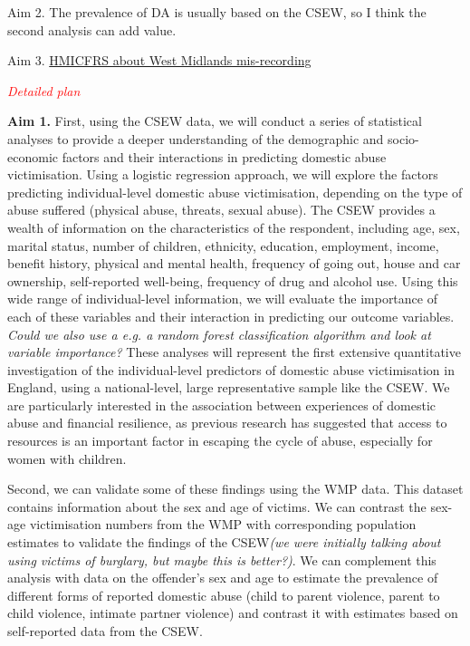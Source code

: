 \documentclass[11pt, a4paper]{article}
\begin{document}
Aim 2. The prevalence of DA is usually based on the CSEW, so I think the second analysis can add value.

Aim 3. \href{https://www.justiceinspectorates.gov.uk/hmicfrs/news/news-feed/little-evidence-of-improvements-in-crime-recording-at-west-midlands-police/}{HMICFRS about West Midlands mis-recording}

\textcolor{red}{\textit{Detailed plan}}

\textbf{Aim 1.} First, using the CSEW data, we will conduct a series of statistical analyses to provide a deeper understanding of the demographic and socio-economic factors and their interactions in predicting domestic abuse victimisation. Using a logistic regression approach, we will explore the factors predicting individual-level domestic abuse victimisation, depending on the type of abuse suffered (physical abuse, threats, sexual abuse). The CSEW provides a wealth of information on the characteristics of the respondent, including age, sex, marital status, number of children, ethnicity, education, employment, income, benefit history, physical and mental health, frequency of going out, house and car ownership, self-reported well-being, frequency of drug and alcohol use. Using this wide range of individual-level information, we will evaluate the importance of each of these variables and their interaction in predicting our outcome variables. \textit{Could we also use a e.g. a random forest classification algorithm and look at variable importance?}  These analyses will represent the first extensive quantitative investigation of the individual-level predictors of domestic abuse victimisation in England, using a national-level, large representative sample like the CSEW. We are particularly interested in the association between experiences of domestic abuse and financial resilience, as previous research has suggested that access to resources is an important factor in escaping the cycle of abuse, especially for women with children.

Second, we can validate some of these findings using the WMP data. This dataset contains information about the sex and age of victims. We can contrast the sex-age victimisation numbers from the WMP with corresponding population estimates to validate the findings of the CSEW\textit{(we were initially talking about using victims of burglary, but maybe this is better?)}. We can complement this analysis with data on the offender's sex  and age to estimate the prevalence of different forms of reported domestic abuse (child to parent violence, parent to child violence, intimate partner violence) and contrast it with estimates based on self-reported data from the CSEW.
\end{document}
